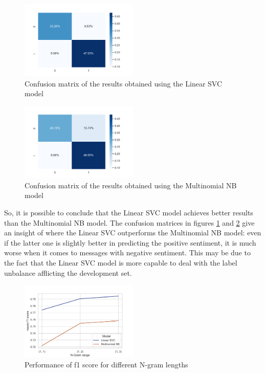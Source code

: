 \documentclass[conference]{IEEEtran}
\begin{document}
\begin{figure}
    \includegraphics[width=0.5\textwidth]{conf_matrix_SVC}
    \caption[Linear SVC confusion matrix]{Confusion matrix of the results obtained using the Linear SVC model}
    \label{fig:conf_matrix_SVC}
\end{figure}
\begin{figure}
    \includegraphics[width=0.5\textwidth]{conf_matrix_NB}
    \caption[Multinomial NB confusion matrix]{Confusion matrix of the results obtained using the Multinomial NB model}
    \label{fig:conf_matrix_NB}
\end{figure}
So, it is possible to conclude that the Linear SVC model achieves better results than the Multinomial NB model. The confusion matrices in figures \ref{fig:conf_matrix_SVC} and \ref{fig:conf_matrix_NB} give an insight of where the Linear SVC outperforms the Multinomial NB model: even if the latter one is slightly better in predicting the positive sentiment, it is much worse when it comes to messages with negative sentiment. This may be due to the fact that the Linear SVC model is more capable to deal with the label unbalance afflicting the development set. \\
\begin{figure}
    \includegraphics[width=0.5\textwidth]{ngram_f1_score}
    \caption[F1 score as function of N-Gram range]{Performance of f1 score for different N-gram lengths}
    \label{fig:ngram_f1_score}
\end{figure}
\end{document}
